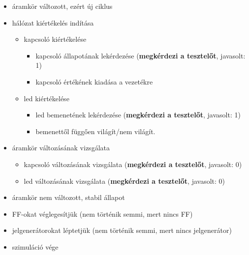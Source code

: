 {\begin{itemize}
\begin{itemize}
\begin{itemize}
\setlength{\itemsep}{0cm}%
\setlength{\parskip}{0cm}%
	\item kapcsoló változásának vizsgálata (\textbf{megkérdezi a tesztelőt}, javasolt: 1)
	\item led változásának vizsgálata (\textit{idáig nem kéne eljutni, ha fent jót válaszolt a tesztelő})
\end{itemize}
\item áramkör változott, ezért új ciklus
\item hálózat kiértékelés indítása
\begin{itemize}
\setlength{\itemsep}{0cm}%
\setlength{\parskip}{0cm}%
	\item kapcsoló kiértékelése
	\begin{itemize}
	\setlength{\itemsep}{0cm}%
	\setlength{\parskip}{0cm}%
		\item kapcsoló állapotának lekérdezése (\textbf{megkérdezi a tesztelőt}, javasolt: 1)
		\item kapcsoló értékének kiadása a vezetékre
	\end{itemize}
	\item led kiértékelése
	\begin{itemize}
	\setlength{\itemsep}{0cm}%
	\setlength{\parskip}{0cm}%
		\item led bemenetének lekérdezése (\textbf{megkérdezi a tesztelőt}, javasolt: 1)
		\item bemenettől függően világít/nem világít.
	\end{itemize}
\end{itemize}
\item áramkör változásának vizsgálata
\begin{itemize}
\setlength{\itemsep}{0cm}%
\setlength{\parskip}{0cm}%
	\item kapcsoló változásának vizsgálata (\textbf{megkérdezi a tesztelőt}, javasolt: 0)
	\item led változásának vizsgálata (\textbf{megkérdezi a tesztelőt}, javasolt: 0)
\end{itemize}
\item áramkör nem változott, stabil állapot
\item FF-okat véglegesítjük (nem történik semmi, mert nincs FF)
\item jelgenerátorokat léptetjük (nem történik semmi, mert nincs jelgenerátor)
\item szimuláció vége
\end{itemize}
\end{itemize}
\vspace{-15pt}}

